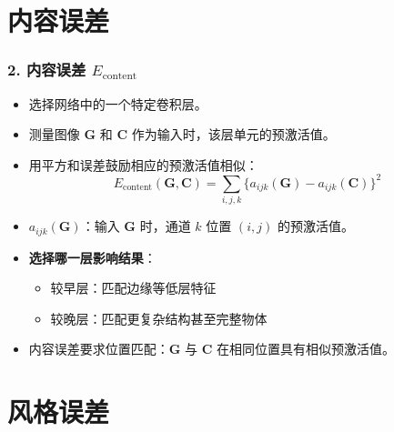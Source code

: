 \documentclass[t,aspectratio=169]{beamer} %
\begin{document}
\section{内容误差}

\begin{frame}
    \frametitle{2. 内容误差 $E_{\text{content}}$}
    \begin{itemize}
        \item 选择网络中的一个\alert{特定卷积层}。
        \item 测量图像 $\mathbf{G}$ 和 $\mathbf{C}$ 作为输入时，该层单元的\alert{预激活值}。
        \item 用\alert{平方和误差}鼓励相应的预激活值相似：
        \begin{equation}
            E_{\text{content}}(\mathbf{G}, \mathbf{C}) = \sum_{i,j,k} \{a_{ijk}(\mathbf{G}) - a_{ijk}(\mathbf{C})\}^2
            \tag{10.14}
        \end{equation}
        \item $a_{ijk}(\mathbf{G})$：输入 $\mathbf{G}$ 时，通道 $k$ 位置 $(i,j)$ 的预激活值。
        \item \textbf{选择哪一层影响结果}：
        \begin{itemize}
            \item \alert{较早层}：匹配边缘等低层特征
            \item \alert{较晚层}：匹配更复杂结构甚至完整物体
        \end{itemize}
        \item 内容误差要求\alert{位置匹配}：$\mathbf{G}$ 与 $\mathbf{C}$ 在相同位置具有相似预激活值。
    \end{itemize}
\end{frame}

\section{风格误差}
\end{document}
